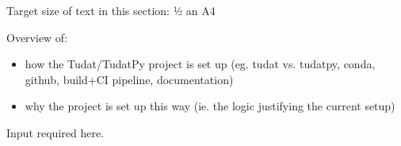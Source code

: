 \lbrack Target size of text in this section: ½ an A4\rbrack

Overview of:

\begin{itemize}
    \item how the Tudat/TudatPy project is set up (eg. tudat vs. tudatpy, conda, github, build+CI pipeline, documentation)
    \item why the project is set up this way (ie. the logic justifying the current setup)
\end{itemize}

\lbrack Input required here.\rbrack
